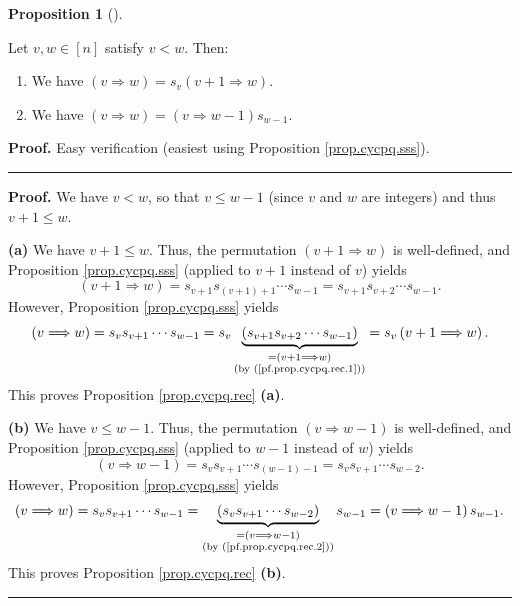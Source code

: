 \documentclass[numbers=enddot,12pt,final,onecolumn,notitlepage]{scrartcl}%
\theoremstyle{definition}
\newtheorem{prop}[theo]{Proposition}
\newenvironment{proposition}[1][]
{\begin{prop}[#1]\begin{leftbar}}
{\end{leftbar}\end{prop}}
\newenvironment{verlong}{}{}
\newenvironment{vershort}{}{}
\newenvironment{proof}[1][Proof]{\noindent\textbf{#1.} }{\ \rule{0.5em}{0.5em}}
\begin{document}
\begin{proposition}
\label{prop.cycpq.rec}Let $v,w\in\left[  n\right]  $ satisfy $v<w$. Then:

\begin{enumerate}
\item[\textbf{(a)}] We have $\left(  v\Longrightarrow w\right)  =s_{v}\left(
v+1\Longrightarrow w\right)  $.

\item[\textbf{(b)}] We have $\left(  v\Longrightarrow w\right)  =\left(
v\Longrightarrow w-1\right)  s_{w-1}$.
\end{enumerate}
\end{proposition}

\begin{vershort}


\begin{proof}
Easy verification (easiest using Proposition \ref{prop.cycpq.sss}).
\end{proof}
\end{vershort}

\begin{verlong}


\begin{proof}
We have $v<w$, so that $v\leq w-1$ (since $v$ and $w$ are integers) and thus
$v+1\leq w$. \medskip

\textbf{(a)} We have $v+1\leq w$. Thus, the permutation $\left(
v+1\Longrightarrow w\right)  $ is well-defined, and Proposition
\ref{prop.cycpq.sss} (applied to $v+1$ instead of $v$) yields
\begin{equation}
\left(  v+1\Longrightarrow w\right)  =s_{v+1}s_{\left(  v+1\right)  +1}\cdots
s_{w-1}=s_{v+1}s_{v+2}\cdots s_{w-1}. \label{pf.prop.cycpq.rec.1}%
\end{equation}
However, Proposition \ref{prop.cycpq.sss} yields
\[
\left(  v\Longrightarrow w\right)  =s_{v}s_{v+1}\cdots s_{w-1}=s_{v}%
\underbrace{\left(  s_{v+1}s_{v+2}\cdots s_{w-1}\right)  }_{\substack{=\left(
v+1\Longrightarrow w\right)  \\\text{(by (\ref{pf.prop.cycpq.rec.1}))}}%
}=s_{v}\left(  v+1\Longrightarrow w\right)  .
\]
This proves Proposition \ref{prop.cycpq.rec} \textbf{(a)}. \medskip

\textbf{(b)} We have $v\leq w-1$. Thus, the permutation $\left(
v\Longrightarrow w-1\right)  $ is well-defined, and Proposition
\ref{prop.cycpq.sss} (applied to $w-1$ instead of $w$) yields
\begin{equation}
\left(  v\Longrightarrow w-1\right)  =s_{v}s_{v+1}\cdots s_{\left(
w-1\right)  -1}=s_{v}s_{v+1}\cdots s_{w-2}. \label{pf.prop.cycpq.rec.2}%
\end{equation}
However, Proposition \ref{prop.cycpq.sss} yields
\[
\left(  v\Longrightarrow w\right)  =s_{v}s_{v+1}\cdots s_{w-1}%
=\underbrace{\left(  s_{v}s_{v+1}\cdots s_{w-2}\right)  }_{\substack{=\left(
v\Longrightarrow w-1\right)  \\\text{(by (\ref{pf.prop.cycpq.rec.2}))}%
}}s_{w-1}=\left(  v\Longrightarrow w-1\right)  s_{w-1}.
\]
This proves Proposition \ref{prop.cycpq.rec} \textbf{(b)}.
\end{proof}
\end{verlong}
\end{document}
